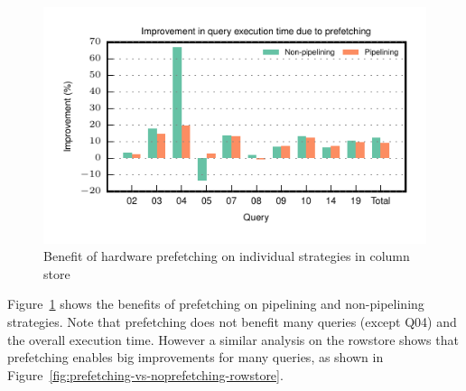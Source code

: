 \begin{figure}
	\centering 
	\includegraphics[width=0.6\textheight]{pipeline/figures/prefetching-improvement-tpch-ccs-20threads-bs2mb}
	\caption{Benefit of hardware prefetching on individual strategies in column store}
	\label{fig:prefetching-vs-noprefetching-ccs}
\end{figure}

Figure~\ref{fig:prefetching-vs-noprefetching-ccs} shows the benefits of prefetching on pipelining and non-pipelining strategies.
Note that prefetching does not benefit many queries (except Q04) and the overall execution time.
However a similar analysis on the rowstore shows that prefetching enables big improvements for many queries, as shown in Figure~\ref{fig:prefetching-vs-noprefetching-rowstore}. 

